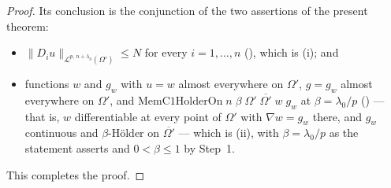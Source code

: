 \begin{proof}
Its conclusion is the conjunction of the two assertions of the present theorem:
\begin{itemize}
\item $\|D_iu\|_{\mathcal L^{p,\,n+\lambda_0}(\Omega')}\le N$ for every
  $i=1,\dots,n$ (), which is (i); and
\item functions $w$ and $g_w$ with $u=w$ almost everywhere on $\Omega'$,
  $g=g_w$ almost everywhere on $\Omega'$, and
  $\mathrm{MemC1HolderOn}\;n\;\beta\;\Omega'\;\overline{\Omega'}\;w\;g_w$ at
  $\beta=\lambda_0/p$ () --- that is, $w$ differentiable
  at every point of $\Omega'$ with $\nabla w=g_w$ there, and $g_w$ continuous
  and $\beta$-H\"older on $\overline{\Omega'}$ --- which is (ii), with
  $\beta=\lambda_0/p$ as the statement asserts and $0<\beta\le1$ by Step~1.
\end{itemize}
This completes the proof.
\end{proof}
